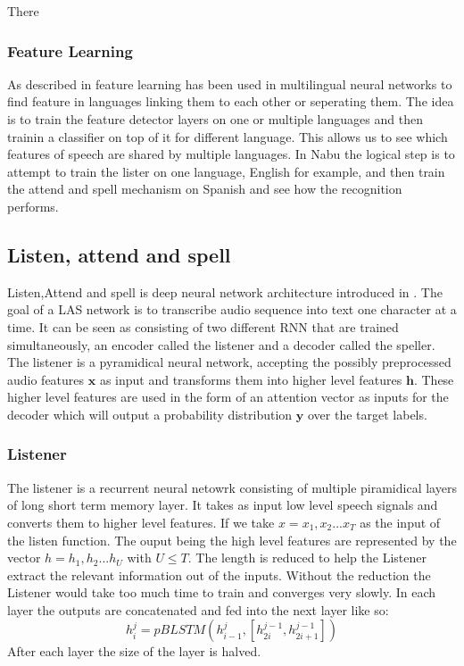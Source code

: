 \documentclass[a4paper]{article}
\begin{document}
There  

\subsubsection{Feature Learning}
As described in \cite{multi3} feature learning has been used in multilingual neural networks to find feature in languages linking them to each other or seperating them. The idea is to train the feature detector layers on one or multiple languages and then trainin a classifier on top of it for  different language. This allows us to see which features of speech are shared by multiple languages. In Nabu the logical step is to attempt to train the lister on one language, English for example, and then train the attend and spell mechanism on Spanish and see how the recognition performs.

\subsection{Listen, attend and spell}
Listen,Attend and spell is deep neural network architecture introduced in \cite{LAS}. The goal of a LAS network is to transcribe audio sequence into text one character at a time. It can be seen as consisting of two different RNN that are trained simultaneously, an encoder called the listener and a decoder called the speller. The listener is a pyramidical neural network, accepting the possibly preprocessed audio features $\bm{x}$ as input and transforms them into higher level features $\bm{h}$. These higher level features are used in the form of an attention vector as inputs for the decoder which will output a probability distribution $\bm{y}$ over the target labels.

\subsubsection{Listener}
The listener is a recurrent neural netowrk consisting of multiple piramidical layers of long short term memory layer. It takes as input low level speech signals and converts them to higher level features. If we take $x = {x_1,x_2...x_T}$ as the input of the listen function. The ouput being the high level features are represented by the vector $h = {h_1,h_2...h_U}$ with $U \leq T$. The length is reduced to help the Listener extract the relevant information out of the inputs. Without the reduction the Listener would take too much time to train and converges very slowly. In each layer the outputs are concatenated and fed into the next layer like so:
$$h_{i}^{j} = pBLSTM(h_{i-1}^{j},[h_{2i}^{j-1},h_{2i+1}^{j-1}])$$
After each layer the size of the layer is halved.
\end{document}
